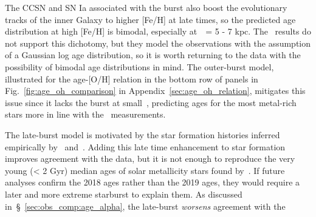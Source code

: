 \documentclass[draft2.tex]{subfiles}
\begin{document}
The CCSN and SN Ia associated with the burst also boost the evolutionary 
tracks of the inner Galaxy to higher [Fe/H] at late times, so the predicted 
age distribution at high [Fe/H] is bimodal, especially at~\rgal~= 5 - 7 kpc. 
The~\citet{Feuillet2019} results do not support this dichotomy, but they 
model the observations with the assumption of a Gaussian log age distribution, 
so it is worth returning to the data with the possibility of bimodal age 
distributions in mind. 
{\color{red} 
The outer-burst model, illustrated for the age-[O/H] relation in the bottom 
row of panels in Fig.~\ref{fig:age_oh_comparison} in 
Appendix~\ref{sec:age_oh_relation}, mitigates this issue since it lacks the 
burst at small~\rgal, predicting ages for the most metal-rich stars more in line 
with the~\citet{Feuillet2019} measurements. 
}
\par 
The late-burst model is motivated by the star formation histories inferred 
empirically by~\citet{Isern2019} and~\citet{Mor2019}. 
Adding this late time enhancement to star formation improves agreement with the 
\citet{Feuillet2019} data, but it is not enough to reproduce the very young 
(< 2 Gyr) median ages of solar metallicity stars found by~\citet{Feuillet2018}. 
If future analyses confirm the 2018 ages rather than the 2019 ages, they would 
require a later and more extreme starburst to explain them. 
As discussed in~\S~\ref{sec:obs_comp:age_alpha}, the late-burst 
\textit{worsens} agreement with the~\citet{Feuillet2018, Feuillet2019} 
\end{document}
